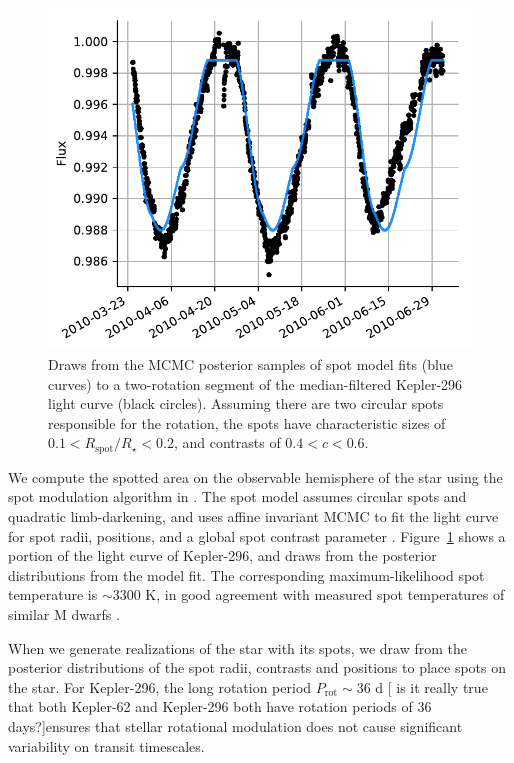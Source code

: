 \begin{figure}
\centering
\includegraphics[scale=0.6]{libra/model_kepler296_darkspots.pdf}
\caption{Draws from the MCMC posterior samples of spot model fits (blue curves) to a two-rotation segment of the median-filtered Kepler-296  light curve (black circles). Assuming there are two circular spots responsible for the rotation, the spots have characteristic sizes of $0.1 < R_\mathrm{spot}/R_\star < 0.2$, and contrasts of $0.4 < c < 0.6$.}
\label{fig:stsp_k296}
\end{figure}

We compute the spotted area on the observable hemisphere of the star using the spot modulation algorithm in \citet{Morris2018b}. The spot model assumes circular spots and quadratic limb-darkening, and uses affine invariant MCMC to fit the light curve for spot radii, positions, and a global spot contrast parameter \citep{Foreman-Mackey2013}. Figure~\ref{fig:stsp_k296} shows a portion of the \kepler light curve of Kepler-296, and draws from the posterior distributions from the model fit. The corresponding maximum-likelihood spot temperature is $\sim 3300$ K, in good agreement with measured spot temperatures of similar M dwarfs \citep{Berdyugina2005}.

When we generate realizations of the star with its spots, we draw from the posterior distributions of the spot radii, contrasts and positions to place spots on the star. For Kepler-296, the long rotation period $P_\mathrm{rot} \sim 36$ d [ is it really true that both Kepler-62 and Kepler-296 both have rotation periods of 36 days?]ensures that stellar rotational modulation does not cause significant variability on transit timescales.

